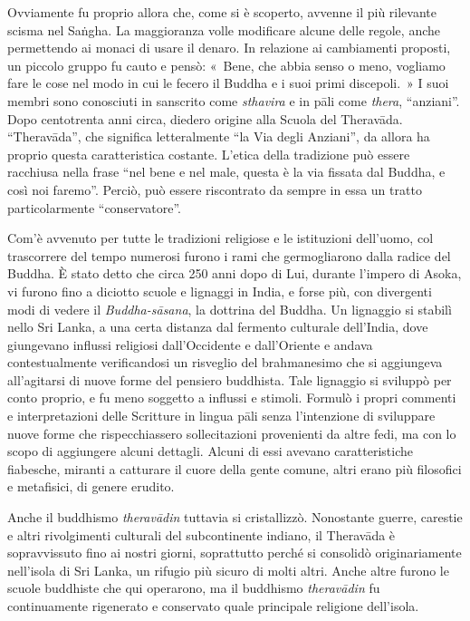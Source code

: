 Ovviamente fu proprio allora che, come si è scoperto, avvenne il più
rilevante scisma nel Saṅgha. La maggioranza volle modificare alcune
delle regole, anche permettendo ai monaci di usare il denaro. In
relazione ai cambiamenti proposti, un piccolo gruppo fu cauto e pensò:
«~Bene, che abbia senso o meno, vogliamo fare le cose nel modo in cui le
fecero il Buddha e i suoi primi discepoli.~» I suoi membri sono
conosciuti in sanscrito come \emph{sthavira} e in pāli come
\emph{thera}, ``anziani''. Dopo centotrenta anni circa, diedero origine
alla Scuola del Theravāda. ``Theravāda'', che significa letteralmente
``la Via degli Anziani'', da allora ha proprio questa caratteristica
costante. L'etica della tradizione può essere racchiusa nella frase
``nel bene e nel male, questa è la via fissata dal Buddha, e così noi
faremo''. Perciò, può essere riscontrato da sempre in essa un tratto
particolarmente ``conservatore''.

Com'è avvenuto per tutte le tradizioni religiose e le istituzioni
dell'uomo, col trascorrere del tempo numerosi furono i rami che
germogliarono dalla radice del Buddha. È stato detto che circa 250 anni
dopo di Lui, durante l'impero di Asoka, vi furono fino a diciotto scuole
e lignaggi in India, e forse più, con divergenti modi di vedere il
\emph{Buddha-sāsana}, la dottrina del Buddha. Un lignaggio si stabilì
nello Sri Lanka, a una certa distanza dal fermento culturale dell'India,
dove giungevano influssi religiosi dall'Occidente e dall'Oriente e
andava contestualmente verificandosi un risveglio del brahmanesimo che
si aggiungeva all'agitarsi di nuove forme del pensiero buddhista. Tale
lignaggio si sviluppò per conto proprio, e fu meno soggetto a influssi e
stimoli. Formulò i propri commenti e interpretazioni delle Scritture in
lingua pāli senza l'intenzione di sviluppare nuove forme che
rispecchiassero sollecitazioni provenienti da altre fedi, ma con lo
scopo di aggiungere alcuni dettagli. Alcuni di essi avevano
caratteristiche fiabesche, miranti a catturare il cuore della gente
comune, altri erano più filosofici e metafisici, di genere erudito.

Anche il buddhismo \emph{theravādin} tuttavia si cristallizzò.
Nonostante guerre, carestie e altri rivolgimenti culturali del
subcontinente indiano, il Theravāda è sopravvissuto fino ai nostri
giorni, soprattutto perché si consolidò originariamente nell'isola di
Sri Lanka, un rifugio più sicuro di molti altri. Anche altre furono le
scuole buddhiste che qui operarono, ma il buddhismo \emph{theravādin} fu
continuamente rigenerato e conservato quale principale religione
dell'isola.

